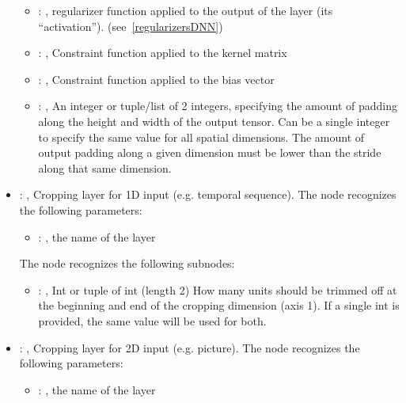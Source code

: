 \begin{itemize}
\begin{itemize}
        \item {}: , 
          regularizer function applied to the output         of the layer (its ``activation'').
          (see~\ref{regularizersDNN})

        \item {}: , 
          Constraint function applied to the kernel matrix

        \item {}: , 
          Constraint function applied to the bias vector

        \item {}: , 
          An integer or tuple/list of 2 integers, specifying the amount of padding along the height
          and         width of the output tensor. Can be a single integer to specify the same value
          for all spatial dimensions.         The amount of output padding along a given dimension
          must be lower than the stride along that same dimension.
      \end{itemize}

    \item {}: , 
      Cropping layer for 1D input (e.g. temporal sequence).
      The  node recognizes the following parameters:
        \begin{itemize}
          \item {}: , 
            the name of the layer
      \end{itemize}

      The  node recognizes the following subnodes:
      \begin{itemize}
        \item {}: , 
          Int or tuple of int (length 2) How many units should be trimmed off at the beginning and
          end of the         cropping dimension (axis 1). If a single int is provided, the same
          value will be used for both.
      \end{itemize}

    \item {}: , 
      Cropping layer for 2D input (e.g. picture).
      The  node recognizes the following parameters:
        \begin{itemize}
          \item {}: , 
            the name of the layer
      \end{itemize}


\end{itemize}

